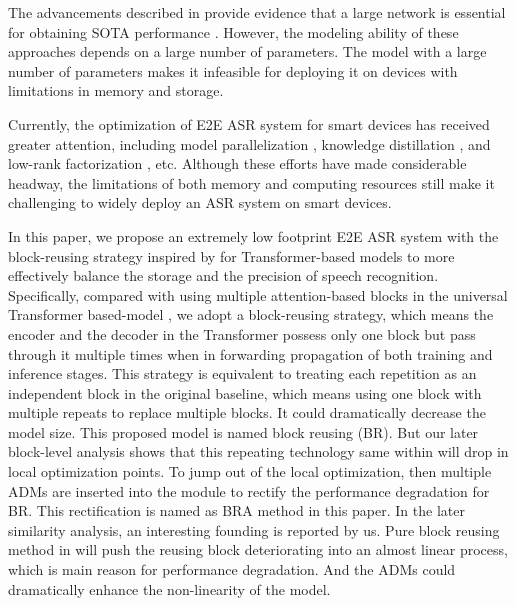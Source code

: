 \documentclass{INTERSPEECH2023}
\begin{document}
The advancements described in \cite{raffel2020exploring, gulati2020conformer} provide evidence that a large network is essential for obtaining SOTA performance \cite{ng2021pushing, guo2021recent}. However, the modeling ability of these approaches depends on a large number of parameters. The model with a large number of parameters makes it infeasible for deploying it on devices with limitations in memory and storage.







Currently, the optimization of E2E ASR system for smart devices has received greater attention, including model parallelization \cite{shao2020pychain}, knowledge distillation \cite{yang2022knowledge}, and low-rank factorization \cite{winata2020lightweight}, etc. Although these efforts have made considerable headway, the limitations of both memory and computing resources still make it challenging to widely deploy an ASR system on smart devices.

In this paper, we propose an extremely low footprint E2E ASR system with the block-reusing strategy inspired by \cite{dehghani2018universal, lan2019albert} for Transformer-based models to more effectively balance the storage and the precision of speech recognition. Specifically, compared with using multiple attention-based blocks in the universal Transformer based-model \cite{dong2018speech}, we adopt a block-reusing strategy, which means the encoder and the decoder in the Transformer possess only one block but pass through it multiple times when in forwarding propagation of both training and inference stages. 
This strategy is equivalent to treating each repetition as an independent block in the original baseline, which means using one block with multiple repeats to replace multiple blocks. It could dramatically decrease the model size. This proposed model is named block reusing (BR). But our later block-level analysis shows that this repeating technology same within \cite{dehghani2018universal, lan2019albert} will drop in local optimization points. To jump out of the local optimization, then multiple ADMs are inserted into the module to rectify the performance degradation for BR. This rectification is named as BRA method in this paper. In the later similarity analysis, an interesting founding is reported by us. Pure block reusing method in \cite{dehghani2018universal, lan2019albert} will push the reusing block deteriorating into an almost linear process, which is main reason for performance degradation. And the ADMs could dramatically enhance the non-linearity of the model.
\end{document}
